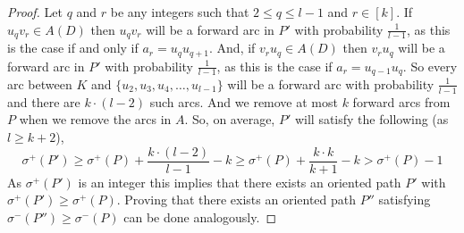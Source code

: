 \documentclass[10pt,a4paper]{amsart}
\begin{document}
\begin{proof}
{          Let $q$ and $r$ be any integers such that $2 \leq q \leq l-1$ and $r \in [k]$.
          If  $u_q v_r \in A(D)$ then $u_qv_r$ will be a forward arc in $P'$ with probability $\frac{1}{l-1}$, as this is the case if and only if $a_r = u_q u_{q+1}$.
        And, if  $v_r u_q \in A(D)$ then $v_r u_q$ will be a forward arc in $P'$ with probability $\frac{1}{l-1}$, as
         this is the case if $a_r = u_{q-1} u_{q}$. So every arc between $K$ and $\{u_2,u_3,u_4, \ldots , u_{l-1}\}$ will be a forward arc
        with probability $\frac{1}{l-1}$ and there are $k \cdot (l-2)$ such arcs.  And we remove at most $k$ forward arcs from $P$ when we remove the arcs in $A$. So, on average, $P'$
        will satisfy the following (as $l \geq k+2$),
         \[
        \sigma^+(P') \geq \sigma^+(P) + \frac{k\cdot (l-2)}{l-1} - k \geq \sigma^+(P) + \frac{k\cdot k}{k+1} - k >  \sigma^+(P) -1
        \]
        As $\sigma^+(P')$ is an integer this implies that there exists an oriented path $P'$ with $\sigma^+(P') \geq \sigma^+(P)$.
        Proving that there exists an oriented path $P''$ satisfying $\sigma^-(P'') \ge \sigma^-(P)$ can be done analogously.}
	\end{proof}
\end{document}
